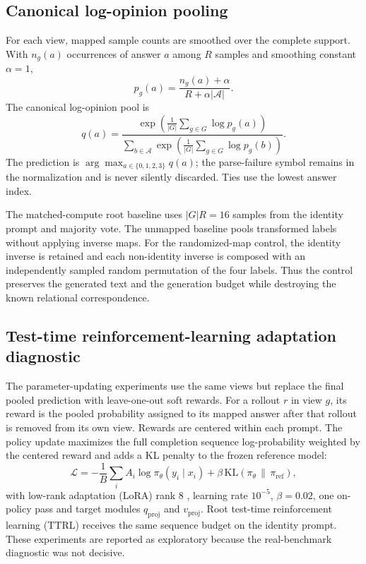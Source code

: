\documentclass[11pt]{article}
\begin{document}
\subsection{Canonical log-opinion pooling}

For each view, mapped sample counts are smoothed over the complete support. With $n_g(a)$ occurrences of answer $a$ among $R$ samples and smoothing constant $\alpha=1$,
\[
 p_g(a)=\frac{n_g(a)+\alpha}{R+\alpha|\mathcal{A}|}.
\]
The canonical log-opinion pool is
\[
 q(a)=\frac{\exp\left(\frac{1}{|G|}\sum_{g\in G}\log p_g(a)\right)}
 {\sum_{b\in\mathcal{A}}\exp\left(\frac{1}{|G|}\sum_{g\in G}\log p_g(b)\right)}.
\]
The prediction is $\arg\max_{a\in\{0,1,2,3\}}q(a)$; the parse-failure symbol remains in the normalization and is never silently discarded. Ties use the lowest answer index.

The matched-compute root baseline uses $|G|R=16$ samples from the identity prompt and majority vote. The unmapped baseline pools transformed labels without applying inverse maps. For the randomized-map control, the identity inverse is retained and each non-identity inverse is composed with an independently sampled random permutation of the four labels. Thus the control preserves the generated text and the generation budget while destroying the known relational correspondence.

\subsection{Test-time reinforcement-learning adaptation diagnostic}

The parameter-updating experiments use the same views but replace the final pooled prediction with leave-one-out soft rewards. For a rollout $r$ in view $g$, its reward is the pooled probability assigned to its mapped answer after that rollout is removed from its own view. Rewards are centered within each prompt. The policy update maximizes the full completion sequence log-probability weighted by the centered reward and adds a KL penalty to the frozen reference model:
\[
 \mathcal{L}= -\frac{1}{B}\sum_i A_i\log\pi_\theta(y_i\mid x_i)
 +\beta\,\mathrm{KL}(\pi_\theta\,\|\,\pi_{\mathrm{ref}}),
\]
with low-rank adaptation (LoRA) rank 8 \citep{hu2022lora}, learning rate $10^{-5}$, $\beta=0.02$, one on-policy pass and target modules $q_{\mathrm{proj}}$ and $v_{\mathrm{proj}}$. Root test-time reinforcement learning (TTRL) receives the same sequence budget on the identity prompt. These experiments are reported as exploratory because the real-benchmark diagnostic was not decisive.
\end{document}
